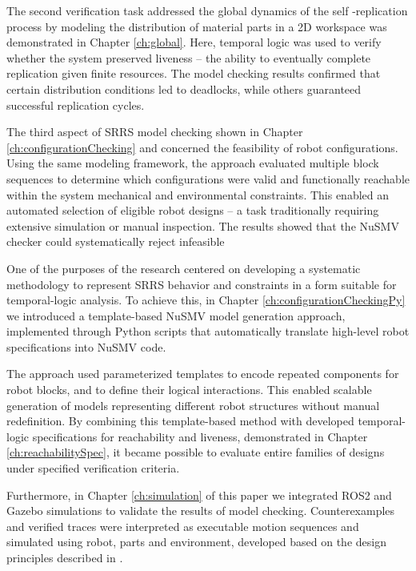 The second verification task addressed the global dynamics of the self
-replication process by modeling the distribution of material parts in 
a 2D workspace was demonstrated in Chapter \ref{ch:global}. 
Here, temporal logic was used to verify whether the 
system preserved liveness -- the ability to eventually complete replication 
given finite resources. The model checking results confirmed that 
certain distribution conditions led to deadlocks, while others 
guaranteed successful replication cycles.

The third aspect of SRRS model checking shown in Chapter \ref{ch:configurationChecking}
and concerned the feasibility of robot configurations.
Using the same modeling framework, the approach evaluated multiple block 
sequences to determine which configurations were valid and functionally reachable 
within the system mechanical and environmental constraints. 
This enabled an automated selection of eligible robot designs -- a task 
traditionally requiring extensive simulation or manual inspection.
The results showed that the NuSMV checker could systematically reject infeasible 

One of the purposes of the research centered on developing a systematic methodology 
to represent SRRS behavior and constraints in a form suitable for temporal-logic analysis.
To achieve this, in Chapter \ref{ch:configurationCheckingPy} 
we introduced a template-based NuSMV model generation 
approach, implemented through Python scripts that automatically translate 
high-level robot specifications into  NuSMV code.

The approach used parameterized templates to encode repeated components for robot
blocks, and to define their logical interactions.
This enabled scalable generation of models representing different robot 
structures without manual redefinition. 
By combining this template-based method with developed temporal-logic specifications
for reachability and liveness, demonstrated in Chapter \ref{ch:reachabilitySpec},
it became possible to evaluate entire families of designs under  
specified verification criteria.

Furthermore, in Chapter \ref{ch:simulation} of this paper we integrated ROS2 
and Gazebo simulations to validate the results of model checking. 
Counterexamples and verified traces were interpreted as executable motion 
sequences and simulated using robot, parts and environment, developed based on the
design principles described in \cite{Jenett2019MaterialRobot}. 

